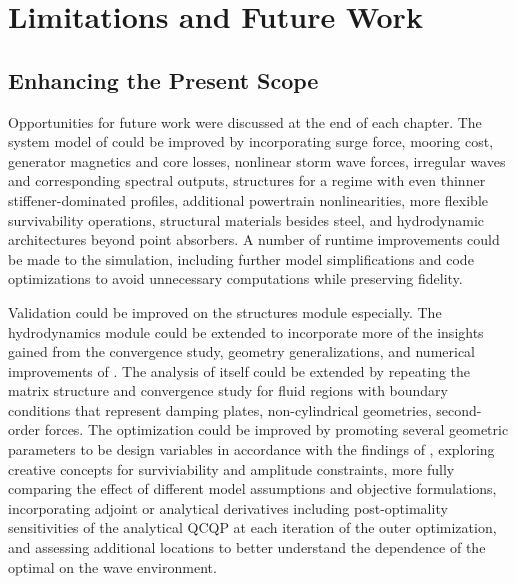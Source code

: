 \section{Limitations and Future Work}
\label{diss:sec:conclusion-future-work}
\subsection{Enhancing the Present Scope}
Opportunities for future work were discussed at the end of each chapter.
The system model of  could be improved by incorporating surge force, mooring cost, generator magnetics and core losses, nonlinear storm wave forces, irregular waves and corresponding spectral outputs, structures for a regime with even thinner stiffener-dominated profiles, additional powertrain nonlinearities, more flexible survivability operations, structural materials besides steel, and hydrodynamic architectures beyond point absorbers.
A number of runtime improvements could be made to the simulation, including further model simplifications and code optimizations to avoid unnecessary computations while preserving fidelity.

Validation could be improved on the structures module especially.
The hydrodynamics module could be extended to incorporate more of the insights gained from the convergence study, geometry generalizations, and numerical improvements of .
The analysis of  itself could be extended by repeating the matrix structure and convergence study for fluid regions with boundary conditions that represent damping plates, non-cylindrical geometries, second-order forces.
The optimization could be improved by promoting several geometric parameters to be design variables in accordance with the findings of ,
exploring creative concepts for surviviability and amplitude constraints,
more fully comparing the effect of different model assumptions and objective formulations,
incorporating adjoint or analytical derivatives including post-optimality sensitivities of the analytical QCQP at each iteration of the outer optimization,
and assessing additional locations to better understand the dependence of the optimal on the wave environment.

